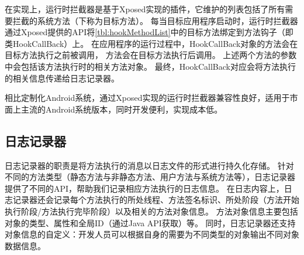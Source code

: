 

在实现上，运行时拦截器是基于Xposed\cite{Xposed}实现的插件，它维护的列表包括了所有需要拦截的系统方法（下称为目标方法）。%
每当目标应用程序启动时，运行时拦截器通过Xposed提供的API将\autoref{tbl:hookMethodList}中的目标方法绑定到方法钩子（即类HookCallBack）上。
在应用程序的运行过程中，HookCallBack对象的方法会在目标方法执行之前被调用，
方法会在目标方法执行后调用。
上述两个方法的参数中会包括该方法执行时的相关方法对象。
最终，HookCallBack对应会将方法执行的相关信息传递给日志记录器。



相比定制化Android系统，通过Xposed实现的运行时拦截器兼容性良好，适用于市面上主流的Android系统版本，同时开发便利，实现成本低。
\subsection{日志记录器}

日志记录器的职责是将方法执行的消息以日志文件的形式进行持久化存储。
针对不同的方法类型（静态方法与非静态方法、用户方法与系统方法等），日志记录器提供了不同的API，帮助我们记录相应方法执行的日志信息。
在日志内容上，日志记录器还会记录每个方法执行的所处线程、方法签名标识、所处阶段（方法开始执行阶段/方法执行完毕阶段）以及相关的方法对象信息。
方法对象信息主要包括对象的类型、属性和全局ID（通过Java API获取）等。
同时，日志记录器还支持对象信息的自定义：开发人员可以根据自身的需要为不同类型的对象输出不同对象数据信息。




